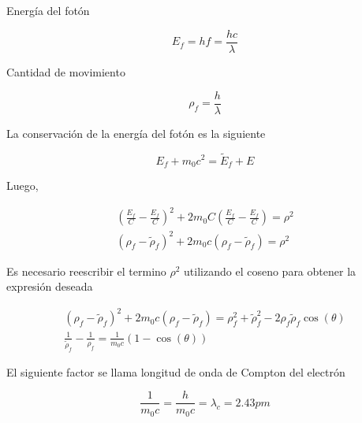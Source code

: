 \documentclass[letterpaper, 12pt]{article}
\begin{document}
\subsection{}

Energía del fotón

\begin{equation*}
      E_{f} = hf= \frac{hc}{\lambda}
\end{equation*}

Cantidad de movimiento

\begin{equation*}
      \rho_{f} = \frac{h}{\lambda}
\end{equation*}

La conservación de la energía del fotón es la siguiente

\begin{equation*}
      E_{f} + m_{0}c^{2} = \widetilde{E}_{f} + E
\end{equation*}

Luego,

\begin{equation*}
      \begin{gathered}
            {(\frac{E_{f}}{C} - \frac{E_{f}}{C})}^{2} + 2m_{0}C(\frac{E_{f}}{C} - \frac{E_{f}}{C}) = \rho^{2} \\
            {(\rho_{f} - \widetilde{\rho}_{f})}^{2} + 2m_{0}c(\rho_{f} - \widetilde{\rho}_{f}) = \rho^{2}
      \end{gathered}
\end{equation*}

Es necesario reescribir el termino $\rho^{2}$ utilizando el
coseno para obtener la expresión deseada

\begin{equation}
      \begin{gathered}
            {(\rho_{f} - \widetilde{\rho}_{f})}^{2} + 2m_{0}c(\rho_{f} - \widetilde{\rho}_{f}) = \rho_{f}^{2} + \widetilde{\rho}_{f}^{2} - 2 \rho_{f}\widetilde{\rho}_{f} \cos(\theta) \\
            \frac{1}{\widetilde{\rho}_{f}} - \frac{1}{\rho_{f}} = \frac{1}{m_{0} c} (1 - \cos(\theta))
      \end{gathered}
      \label{eq:1}
\end{equation}

El siguiente factor se llama longitud de onda de Compton
del electrón

\begin{equation*}
      \frac{1}{m_{0} c} = \frac{h}{m_{0} c} = \lambda_{c} = 2.43 pm
\end{equation*}
\end{document}
